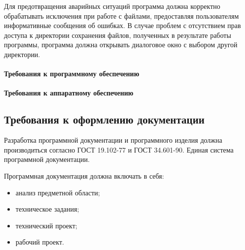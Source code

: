 Для предотвращения аварийных ситуаций программа должна корректно обрабатывать исключения при работе с файлами, предоставляя пользователям информативные сообщения об ошибках. В случае проблем с отсутствием прав доступа к директории сохранения файлов, полученных в результате работы программы, программа должна открывать диалоговое окно с выбором другой директории.

\paragraph {Требования к программному обеспечению}



\paragraph {Требования к аппаратному обеспечению}



\subsection{Требования к оформлению документации}

Разработка программной документации и программного изделия должна производиться согласно ГОСТ 19.102-77 и ГОСТ 34.601-90. Единая система программной документации.

Программная документация должна включать в себя:
\begin{itemize}
	\item анализ предметной области;
	\item техническое задания;
	\item технический проект;
	\item рабочий проект.
\end{itemize}